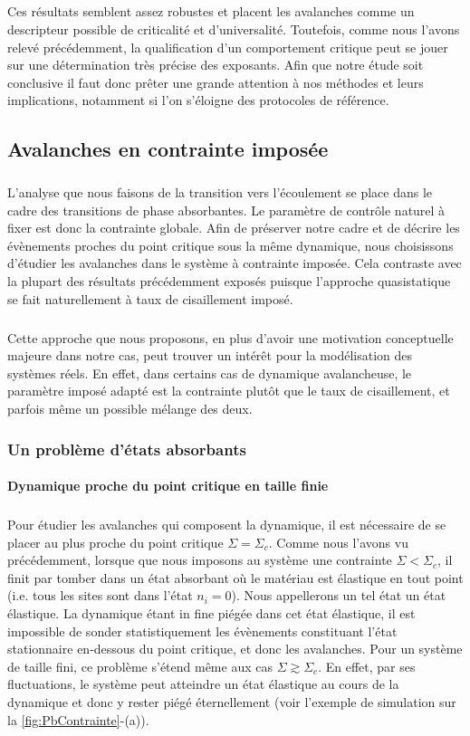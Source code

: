 \subparagraph{}Ces résultats semblent assez robustes et placent les avalanches comme un descripteur possible de criticalité et d'universalité. Toutefois, comme nous l'avons relevé précédemment, la qualification d'un comportement critique peut se jouer sur une détermination très précise des exposants. Afin que notre étude soit conclusive il faut donc prêter une grande attention à nos méthodes et leurs implications, notamment si l'on s'éloigne des protocoles de référence.

\subsection{Avalanches en contrainte imposée}

\subparagraph{}L'analyse que nous faisons de la transition vers l'écoulement se place dans le cadre des transitions de phase absorbantes. Le paramètre de contrôle naturel à fixer est donc la contrainte globale. Afin de préserver notre cadre et de décrire les évènements proches du point critique sous la même dynamique, nous choisissons d'étudier les avalanches dans le système à contrainte imposée. Cela contraste avec la plupart des résultats précédemment exposés puisque l'approche quasistatique se fait naturellement à taux de cisaillement imposé.

\subparagraph{}Cette approche que nous proposons, en plus d'avoir une motivation conceptuelle majeure dans notre cas, peut trouver un intérêt pour la modélisation des systèmes réels. En effet, dans certains cas de dynamique avalancheuse, le paramètre imposé adapté est la contrainte plutôt que le taux de cisaillement, et parfois même un possible mélange des deux.

\subsubsection{Un problème d'états absorbants}

\paragraph{Dynamique proche du point critique en taille finie}

\subparagraph{}Pour étudier les avalanches qui composent la dynamique, il est nécessaire de se placer au plus proche du point critique $\Sigma = \Sigma_c$. Comme nous l'avons vu précédemment, lorsque que nous imposons au système une contrainte $\Sigma < \Sigma_c$, il finit par tomber dans un état absorbant où le matériau est élastique en tout point (i.e. tous les sites sont dans l'état $n_i = 0$). Nous appellerons un tel état un état élastique. La dynamique étant in fine piégée dans cet état élastique, il est impossible de sonder statistiquement les évènements constituant l'état stationnaire en-dessous du point critique, et donc les avalanches. Pour un système de taille fini, ce problème s'étend même aux cas $\Sigma \gtrsim \Sigma_c$. En effet, par ses fluctuations, le système peut atteindre un état élastique au cours de la dynamique et donc y rester piégé éternellement (voir l'exemple de simulation sur la \autoref{fig:PbContrainte}-(a)).

